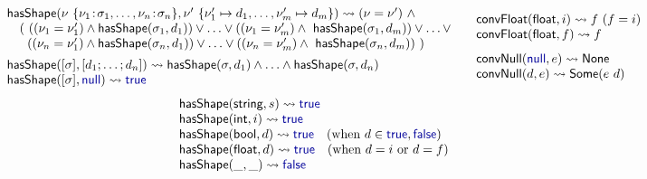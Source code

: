 \documentclass[10pt,preprint,blind,clearpagebib]{sigplanconf}
\newcommand{\kvd}[1]{\textnormal{\textcolor{kvdclr}{\sffamily #1}}}
\newcommand{\ident}[1]{\textnormal{\sffamily #1}}
\newcommand{\reduce}{\rightsquigarrow}
\begin{document}

\begin{figure}
\noindent
\begin{equation*}
\hspace{1.1em}
\begin{array}{l}
\ident{hasShape}(\nu~ \{ \nu_1 \!:\! \sigma_1, \ldots, \nu_n \!:\! \sigma_n \}, \nu'~\{ \nu'_1\mapsto d_1, \ldots, \nu'_m\mapsto d_m \}) \reduce (\nu = \nu') ~\wedge \\
  \quad (~ ((\nu_1 = \nu'_1) \wedge \ident{hasShape}(\sigma_1, d_1)) \vee\ldots\vee ((\nu_1 = \nu'_m) \wedge \ident{hasShape}(\sigma_1, d_m)) \vee \ldots \vee\\
  \quad ~\; ((\nu_n = \nu'_1) \wedge \ident{hasShape}(\sigma_n, d_1)) \vee\ldots\vee ((\nu_n = \nu'_m) \wedge \ident{hasShape}(\sigma_n, d_m))~)
\\[0.5em]
\ident{hasShape}([\sigma], [d_1; \ldots; d_n]) \reduce \ident{hasShape}(\sigma, d_1)\wedge\ldots\wedge\ident{hasShape}(\sigma, d_n) \\
\ident{hasShape}([\sigma], \kvd{null}) \reduce \kvd{true} 
\end{array}  
\quad
\begin{array}{l}
\ident{convFloat}(\ident{float}, i) \reduce f~(f=i) \\
\ident{convFloat}(\ident{float}, f) \reduce f \\[0.75em]
\ident{convNull}(\kvd{null}, e) \reduce \ident{None} \\
\ident{convNull}(d, e) \reduce \ident{Some}(e~d) 
\end{array}
\end{equation*}
%
\vspace{-0.75em}
%
\begin{equation*}
\begin{array}{l}
\ident{hasShape}(\ident{string}, s) \reduce \kvd{true} \\
\ident{hasShape}(\ident{int}, i) \reduce \kvd{true}\\
\ident{hasShape}(\ident{bool}, d) \reduce \kvd{true} \quad(\textnormal{when}~d\in{\kvd{true},\kvd{false}} )\\
\ident{hasShape}(\ident{float}, d) \reduce \kvd{true} \quad(\textnormal{when}~d=i ~\textnormal{or}~ d=f) \\
\ident{hasShape}(\_, \_) \reduce \kvd{false} \\
\end{array}
\;\;
\begin{array}{l}

\end{array}
\end{equation*}
\end{figure}
\end{document}
